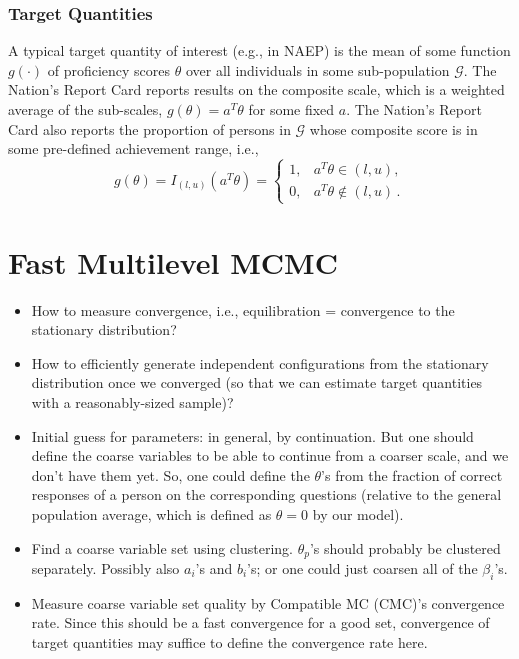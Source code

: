 \documentclass{article}
\newcommand{\ta}{\theta}
\newcommand{\G}{\mathcal{G}}
\begin{document}
\subsubsection{Target Quantities}
A typical target quantity of interest (e.g., in NAEP) is the mean of some function $g(\cdot)$ of proficiency scores $\ta$ over all individuals in some sub-population $\G$. The Nation's Report Card reports results on the composite scale, which is a weighted average of the sub-scales, $g(\ta) = a^T \ta$ for some fixed $a$. The Nation's Report Card also reports the proportion of persons in $\G$ whose composite score is in some pre-defined achievement range, i.e.,
\begin{equation}
	g(\ta) = I_{(l,u)}(a^T \ta) =
  \begin{cases}
    1, & a^T \ta \in (l,u), \\
    0, & a^T \ta \not \in (l,u)\,.
  \end{cases}
\end{equation}

\section{Fast Multilevel MCMC}
\begin{itemize}
	\item How to measure convergence, i.e., equilibration = convergence to the stationary distribution? 
	\item How to efficiently generate independent configurations from the stationary distribution once we converged
	(so that we can estimate target quantities with a reasonably-sized sample)?
	\item Initial guess for parameters: in general, by continuation. But one should define the coarse variables
	to be able to continue from a coarser scale, and we don't have them yet. So, one could define the $\ta$'s
	from the fraction of correct responses of a person on the corresponding questions (relative to the general
	population average, which is defined as $\ta=0$ by our model).
	\item Find a coarse variable set using clustering. $\ta_p$'s should probably be clustered separately. 	Possibly also $a_i$'s and $b_i$'s; or one could just coarsen all of the $\beta_i$'s.
	\item Measure coarse variable set quality by Compatible MC (CMC)'s convergence rate. Since this should be a fast convergence for a good set, convergence of target quantities may suffice to define the convergence rate here.
\end{itemize}
\end{document}
